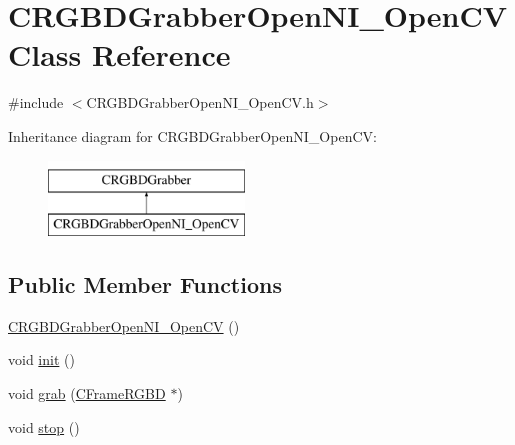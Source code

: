 \hypertarget{class_c_r_g_b_d_grabber_open_n_i___open_c_v}{
\section{CRGBDGrabberOpenNI\_\-OpenCV Class Reference}
\label{class_c_r_g_b_d_grabber_open_n_i___open_c_v}
}


{\ttfamily \#include $<$CRGBDGrabberOpenNI\_\-OpenCV.h$>$}

Inheritance diagram for CRGBDGrabberOpenNI\_\-OpenCV:\begin{figure}[H]
\begin{center}
\leavevmode
\includegraphics[height=2.000000cm]{class_c_r_g_b_d_grabber_open_n_i___open_c_v}
\end{center}
\end{figure}
\subsection*{Public Member Functions}
\begin{DoxyCompactItemize}
\item 
\hyperlink{class_c_r_g_b_d_grabber_open_n_i___open_c_v_a7a7de1dd5987fb2fe33f0883ce5e82ee}{CRGBDGrabberOpenNI\_\-OpenCV} ()
\item 
void \hyperlink{class_c_r_g_b_d_grabber_open_n_i___open_c_v_ac3f36ad66da25fb590e915072bece32e}{init} ()
\item 
void \hyperlink{class_c_r_g_b_d_grabber_open_n_i___open_c_v_a7a1d5c1d4ec74000b15d60e0683d9e77}{grab} (\hyperlink{class_c_frame_r_g_b_d}{CFrameRGBD} $\ast$)
\item 
void \hyperlink{class_c_r_g_b_d_grabber_open_n_i___open_c_v_a3a16ce107e7d613fef517096f3dff39f}{stop} ()
\end{DoxyCompactItemize}
